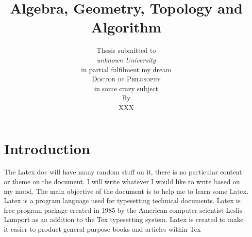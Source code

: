 \documentclass[10pt]{article}
\begin{document}
\title{\bfseries {\sc\textcolor{title}{Algebra, Geometry, Topology and Algorithm}}}
\author{\textcolor{other}{Thesis  submitted to} \\[5pt]
\emph{\textcolor{other}{unknown University}}\\[2cm]
 \textcolor{other}{in partial fulfilment my dream} \\[2cm]
\textsc{\Large{\textcolor{phd}{Doctor of Philosophy}}} \\[5pt]
  \textcolor{other}{in some crazy subject} \vspace{0.4cm} \\[1in]
  \textcolor{other}{By}\\[5pt] {\Large \sc \textcolor{name}{XXX}}
   \vspace{2cm}
}
\date{}
\maketitle

\section{Introduction}
The Latex doc will have many random stuff on it, there is no particular content or theme on the document.
I will write whatever I would like to write based on my mood. The main objective of the document is to 
help me to learn some Latex. Latex is a program language used for typesetting technical documents. 
Latex is free program package created in 1985 by the American computer scientist Leslis Lamport as an addition
to the Tex typesetting system. Latex is created to make it easier to product general-purpose books and articles within Tex
\end{document}
